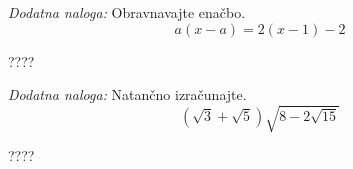 \documentclass[addpoints]{exam}
\begin{document}
\begin{questions}






     \newpage



    \bonusquestion[3]
    \textit{Dodatna naloga:} Obravnavajte enačbo. $$a(x-a)=2(x-1)-2$$

    \begin{solution}[10cm]
        ????
    \end{solution}




        

    \bonusquestion[2]
    \textit{Dodatna naloga:} Natančno izračunajte. $$ \left(\sqrt{3}+\sqrt{5}\right)\sqrt{8-2\sqrt{15}} $$

    \begin{solution}[7cm]
        ????
    \end{solution}




\end{questions}
\end{document}

